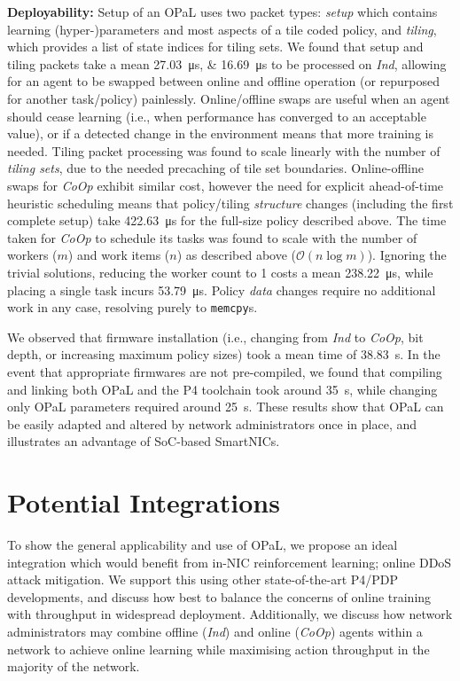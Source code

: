 \documentclass[sigconf,natbib=false]{acmart}
\newcommand{\fakepara}[1]{\noindent\textbf{#1:}}
\newcommand{\approachshort}{OPaL}
\newcommand{\Coopfw}{\emph{CoOp}}
\newcommand{\Indfw}{\emph{Ind}}
\begin{document}
\fakepara{Deployability}
Setup of an \approachshort{} uses two packet types: \emph{setup} which contains learning (hyper-)parameters and most aspects of a tile coded policy, and \emph{tiling}, which provides a list of state indices for tiling sets.
We found that setup and tiling packets take a mean \SIlist{27.03;16.69}{\micro\second} to be processed on \Indfw{}, allowing for an agent to be swapped between online and offline operation (or repurposed for another task/policy) painlessly.
Online/offline swaps are useful when an agent should cease learning (i.e., when performance has converged to an acceptable value), or if a detected change in the environment means that more training is needed.
Tiling packet processing was found to scale linearly with the number of \emph{tiling sets}, due to the needed precaching of tile set boundaries.
Online-offline swaps for \Coopfw{} exhibit similar cost, however the need for explicit ahead-of-time heuristic scheduling means that policy/tiling \emph{structure} changes (including the first complete setup) take \SI{422.63}{\micro\second} for the full-size policy described above.
The time taken for \Coopfw{} to schedule its tasks was found to scale with the number of workers ($m$) and work items ($n$) as described above ($\mathcal{O}{\left(n\log{m}\right)}$).
Ignoring the trivial solutions, reducing the worker count to \num{1} costs a mean \SI{238.22}{\micro\second}, while placing a single task incurs \SI{53.79}{\micro\second}.
Policy \emph{data} changes require no additional work in any case, resolving purely to \texttt{memcpy}s.

We observed that firmware installation (i.e., changing from \Indfw{} to \Coopfw{}, bit depth, or increasing maximum policy sizes) took a mean time of \SI{38.83}{\second}.
In the event that appropriate firmwares are not pre-compiled, we found that compiling and linking both \approachshort{} and the P4 toolchain took around \SI{35}{\second}, while changing only \approachshort{} parameters required around \SI{25}{\second}.
These results show that \approachshort{} can be easily adapted and altered by network administrators once in place, and illustrates an advantage of SoC-based SmartNICs.

\section{Potential Integrations}\label{sec:potential-integrations}
To show the general applicability and use of \approachshort{}, we propose an ideal integration which would benefit from in-NIC reinforcement learning; online DDoS attack mitigation.
We support this using other state-of-the-art P4/PDP developments, and discuss how best to balance the concerns of online training with throughput in widespread deployment.
Additionally, we discuss how network administrators may combine offline (\Indfw) and online (\Coopfw) agents within a network to achieve online learning while maximising action throughput in the majority of the network.
\end{document}
